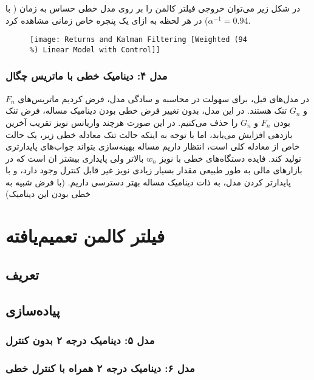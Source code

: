 \documentclass{scribe-cgenomics}
\begin{document}
\begin{نتیجه}
در شکل زیر می‌توان خروجی فیلتر کالمن را بر روی مدل خطی حساس به زمان ( با
$\alpha^{-1} = 0.94$)
در هر لحظه به ازای یک پنجره خاص زمانی مشاهده کرد.

\begin{figure}[h]
\texttt{[image: Returns and Kalman Filtering [Weighted (94\\\%) Linear Model with Control]]}
\centering
\end{figure}
\end{نتیجه}





\subsubsection{مدل ۴: دینامیک خطی با ماتریس چگال}
در مدل‌های قبل، برای سهولت در محاسبه و سادگی مدل، فرض کردیم ماتریس‌های
$F_n$
و
$G_n$
تنک هستند. در این مدل، بدون تغییر فرض خطی بودن دینامیک مساله، فرض تنک بودن
$F_n$
و
$G_n$
را حذف می‌کنیم. در این صورت هرچند واریانس نویز تقریب آخرین بازدهی افزایش می‌یابد، اما با توجه به اینکه حالت تنک معادله خطی زیر، یک حالت خاص از معادله کلی است، انتظار داریم مساله بهینه‌سازی بتواند جواب‌های پایدارتری تولید کند. فایده دستگاه‌های خطی با نویز
$w_n$
بالاتر ولی پایداری بیشتر ان است که در بازارهای مالی به طور طبیعی مقدار بسیار زیادی نویز غیر قابل کنترل وجود دارد، و با پایدارتر کردن مدل، به ذات دینامیک مساله بهتر دسترسی داریم. (با فرض شبیه به خطی بودن این دینامیک)






\section{فیلتر کالمن تعمیم‌یافته}

\subsection{تعریف}
\subsection{پیاده‌سازی}
\subsubsection{مدل ۵: دینامیک درجه ۲ بدون کنترل}
\subsubsection{مدل ۶: دینامیک درجه ۲ همراه با کنترل خطی}
\end{document}
